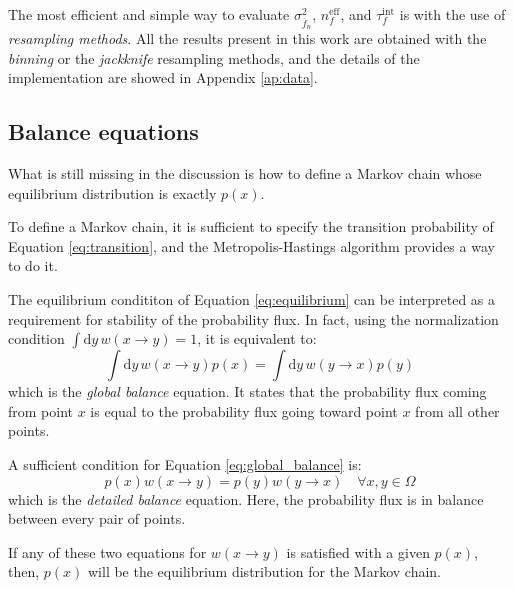 The most efficient and simple way to evaluate $\sigma_{\overline f_n}^2$, $n_f^\mathrm{eff}$, and $\tau_f^\mathrm{int}$ is with the use of \emph{resampling methods}.
All the results present in this work are obtained with the \emph{binning} or the \emph{jackknife} resampling methods,
and the details of the implementation are showed in Appendix \ref{ap:data}.

\subsection*{Balance equations}
What is still missing in the discussion is how to define a Markov chain whose equilibrium distribution is exactly $p(x)$.

To define a Markov chain, it is sufficient to specify the transition probability of Equation \eqref{eq:transition},
and the Metropolis-Hastings algorithm provides a way to do it.

The equilibrium condititon of Equation \eqref{eq:equilibrium}
can be interpreted as a requirement for stability of the probability flux.
In fact, using the normalization condition $\int\mathrm dy\,w(x \to y) = 1$,
it is equivalent to:
\begin{equation}\label{eq:global_balance}
	\int\mathrm dy\,w(x \to y)p(x) = \int\mathrm dy\,w(y \to x)p(y)
\end{equation}
which is the \emph{global balance} equation.
It states that the probability flux coming from point $x$
is equal to the probability flux going toward point $x$ from all other points.

A sufficient condition for Equation \eqref{eq:global_balance} is:
\begin{equation}\label{eq:detailed_balance}
	p(x)w(x \to y) = p(y)w(y \to x) \quad \forall x,y\in\Omega
\end{equation}
which is the \emph{detailed balance} equation.
Here, the probability flux is in balance between every pair of points.

If any of these two equations for $w(x \to y)$ is satisfied with a given $p(x)$,
then, $p(x)$ will be the equilibrium distribution for the Markov chain.


